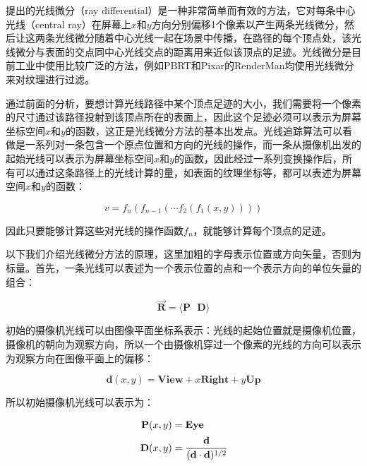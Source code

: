 \cite{a:TracingRayDifferentials}提出的光线微分（ray differential）是一种非常简单而有效的方法，它对每条中心光线（central ray）在屏幕上$x$和$y$方向分别偏移1个像素以产生两条光线微分，然后让这两条光线微分随着中心光线一起在场景中传播，在路径的每个顶点处，该光线微分与表面的交点同中心光线交点的距离用来近似该顶点的足迹。光线微分是目前工业中使用比较广泛的方法，例如PBRT\cite{b:pbrt}和Pixar的RenderMan\cite{a:RayDifferentialsandMultiresolutionGeometryCachingforDistributionRayTracinginComplexScenes}均使用光线微分来对纹理进行过滤。

通过前面的分析，要想计算光线路径中某个顶点足迹的大小，我们需要将一个像素的尺寸通过该路径投射到该顶点所在的表面上，因此这个足迹必须可以表示为屏幕坐标空间$x$和$y$的函数，这正是光线微分方法的基本出发点。光线追踪算法可以看做是一系列对一条包含一个原点位置和方向的光线的操作，而一条从摄像机出发的起始光线可以表示为屏幕坐标空间$x$和$y$的函数，因此经过一系列变换操作后，所有可以通过这条路径上的光线计算的量，如表面的纹理坐标等，都可以表述为屏幕空间$x$和$y$的函数：

\begin{equation}
	v=f_n(f_{n-1}(\cdots f_2(f_1(x,y))))
\end{equation}

\noindent 因此只要能够计算这些对光线的操作函数$f_n$，就能够计算每个顶点的足迹。

以下我们介绍光线微分方法的原理，这里加粗的字母表示位置或方向矢量，否则为标量。首先，一条光线可以表述为一个表示位置的点和一个表示方向的单位矢量的组合：

\begin{equation}
	\overrightarrow{\mathbf{R}}=\langle \mathbf{P} \text{ }\mathbf{D}\rangle
\end{equation}

\noindent 初始的摄像机光线可以由图像平面坐标系表示：光线的起始位置就是摄像机位置，摄像机的朝向为观察方向，所以一个由摄像机穿过一个像素的光线的方向可以表示为观察方向在图像平面上的偏移：

\begin{equation}
	\mathbf{d}(x,y)=\mathbf{View}+x\mathbf{Right}+y\mathbf{Up}
\end{equation}

\noindent 所以初始摄像机光线可以表示为：

\begin{equation}
	\begin{aligned}
		\mathbf{P}(x,y)&=\mathbf{Eye}\\
		\mathbf{D}(x,y)&= \cfrac{\mathbf{d}}{(\mathbf{d}\cdot \mathbf{d})^{1/2}}
	\end{aligned}
\end{equation}

